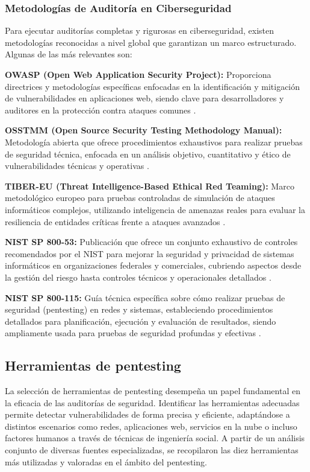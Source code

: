 \documentclass[a4paper, 11pt]{article}
\begin{document}
\subsubsection{Metodologías de Auditoría en Ciberseguridad}

Para ejecutar auditorías completas y rigurosas en ciberseguridad, existen metodologías reconocidas a nivel global que garantizan un marco estructurado. Algunas de las más relevantes son:

\textbf{OWASP (Open Web Application Security Project):} Proporciona directrices y metodologías específicas enfocadas en la identificación y mitigación de vulnerabilidades en aplicaciones web, siendo clave para desarrolladores y auditores en la protección contra ataques comunes \cite{owasp}.

\textbf{OSSTMM (Open Source Security Testing Methodology Manual):} Metodología abierta que ofrece procedimientos exhaustivos para realizar pruebas de seguridad técnica, enfocada en un análisis objetivo, cuantitativo y ético de vulnerabilidades técnicas y operativas \cite{osstmm}.

\textbf{TIBER-EU (Threat Intelligence-Based Ethical Red Teaming):} Marco metodológico europeo para pruebas controladas de simulación de ataques informáticos complejos, utilizando inteligencia de amenazas reales para evaluar la resiliencia de entidades críticas frente a ataques avanzados \cite{tibereu}.

\textbf{NIST SP 800-53:} Publicación que ofrece un conjunto exhaustivo de controles recomendados por el NIST para mejorar la seguridad y privacidad de sistemas informáticos en organizaciones federales y comerciales, cubriendo aspectos desde la gestión del riesgo hasta controles técnicos y operacionales detallados \cite{nist80053}.

\textbf{NIST SP 800-115:} Guía técnica específica sobre cómo realizar pruebas de seguridad (pentesting) en redes y sistemas, estableciendo procedimientos detallados para planificación, ejecución y evaluación de resultados, siendo ampliamente usada para pruebas de seguridad profundas y efectivas \cite{nist800115}.

\subsection{Herramientas de pentesting}

La selección de herramientas de pentesting desempeña un papel fundamental en la eficacia de las auditorías de seguridad. Identificar las herramientas adecuadas permite detectar vulnerabilidades de forma precisa y eficiente, adaptándose a distintos escenarios 
como redes, aplicaciones web, servicios en la nube o incluso factores humanos a través de técnicas de ingeniería social. A partir de un análisis conjunto de diversas fuentes especializadas, se recopilaron las diez herramientas 
más utilizadas y valoradas en el ámbito del pentesting. \cite{felipe2024}
\end{document}
